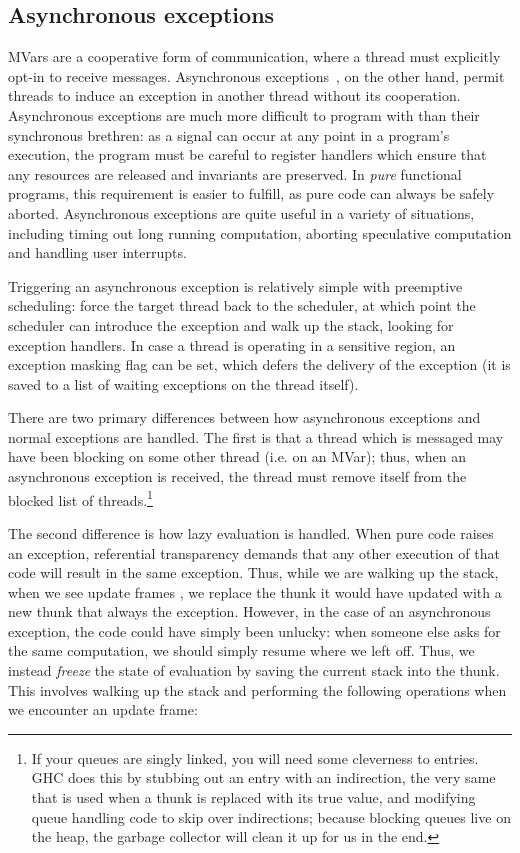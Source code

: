 \subsection{Asynchronous exceptions}

MVars are a cooperative form of communication, where a thread must
explicitly opt-in to receive messages.  Asynchronous
exceptions~\cite{Marlow:2001:AEH:378795.378858}, on the other hand,
permit threads to induce an exception in another thread without its
cooperation.  Asynchronous exceptions are much more difficult to program
with than their synchronous brethren: as a signal can occur at any point
in a program's execution, the program must be careful to register
handlers which ensure that any resources are released and invariants are
preserved.  In \emph{pure} functional programs, this requirement is
easier to fulfill, as pure code can always be safely aborted.
Asynchronous exceptions are quite useful in a variety of situations,
including timing out long running computation, aborting speculative
computation and handling user interrupts.

Triggering an asynchronous exception is relatively simple with
preemptive scheduling: force the target thread back to the scheduler,
at which point the scheduler can introduce the exception and walk up the
stack, looking for exception handlers.  In
case a thread is operating in a sensitive region, an exception masking
flag can be set, which defers the delivery of the exception (it is saved
to a list of waiting exceptions on the thread itself).

There are two primary differences between how asynchronous exceptions
and normal exceptions are handled.  The first is that a thread which is
messaged may have been blocking on some other thread (i.e. on an MVar);
thus, when an asynchronous exception is received, the thread must remove
itself from the blocked list of threads.\footnote{If your queues are
    singly linked, you will need some cleverness to entries. GHC does
    this by stubbing out an entry with an indirection, the very same
that is used when a thunk is replaced with its true value, and modifying
queue handling code to skip over indirections; because blocking queues
live on the heap, the garbage collector will clean it up for us in the end.}

The second difference is how lazy evaluation is handled. When pure code
raises an exception, referential transparency demands that any other
execution of that code will result in the same exception.  Thus, while
we are walking up the stack, when we see update frames ,
we replace the thunk it would have updated with a new thunk that always
the exception.  However, in the case of an asynchronous exception, the
code could have simply been unlucky: when someone else asks for the same
computation, we should simply resume where we left off.  Thus, we
instead \emph{freeze} the state of evaluation by saving the current
stack into the thunk.~\cite{Reid1999}  This involves walking up the stack
and performing the following operations when we encounter an update frame:

